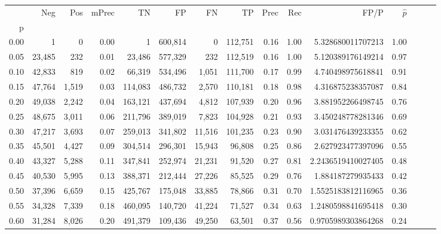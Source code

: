 \begin{tabular}{rrrrrrrrrrrrrrr}
\toprule
{} &     Neg &    Pos & mPrec &       TN &       FP &       FN &       TP &  Prec &   Rec &                  FP/P & $\hat{p}$ \\
p    &         &        &       &          &          &          &          &       &       &                       &           \\
\midrule
0.00 &       1 &      0 &  0.00 &        1 &  600,814 &        0 &  112,751 &  0.16 &  1.00 &     5.328680011707213 &      1.00 \\
0.05 &  23,485 &    232 &  0.01 &   23,486 &  577,329 &      232 &  112,519 &  0.16 &  1.00 &     5.120389176149214 &      0.97 \\
0.10 &  42,833 &    819 &  0.02 &   66,319 &  534,496 &    1,051 &  111,700 &  0.17 &  0.99 &     4.740498975618841 &      0.91 \\
0.15 &  47,764 &  1,519 &  0.03 &  114,083 &  486,732 &    2,570 &  110,181 &  0.18 &  0.98 &     4.316875238357087 &      0.84 \\
0.20 &  49,038 &  2,242 &  0.04 &  163,121 &  437,694 &    4,812 &  107,939 &  0.20 &  0.96 &     3.881952266498745 &      0.76 \\
0.25 &  48,675 &  3,011 &  0.06 &  211,796 &  389,019 &    7,823 &  104,928 &  0.21 &  0.93 &     3.450248778281346 &      0.69 \\
0.30 &  47,217 &  3,693 &  0.07 &  259,013 &  341,802 &   11,516 &  101,235 &  0.23 &  0.90 &     3.031476439233355 &      0.62 \\
0.35 &  45,501 &  4,427 &  0.09 &  304,514 &  296,301 &   15,943 &   96,808 &  0.25 &  0.86 &     2.627923477397096 &      0.55 \\
0.40 &  43,327 &  5,288 &  0.11 &  347,841 &  252,974 &   21,231 &   91,520 &  0.27 &  0.81 &    2.2436519410027405 &      0.48 \\
0.45 &  40,530 &  5,995 &  0.13 &  388,371 &  212,444 &   27,226 &   85,525 &  0.29 &  0.76 &     1.884187279935433 &      0.42 \\
0.50 &  37,396 &  6,659 &  0.15 &  425,767 &  175,048 &   33,885 &   78,866 &  0.31 &  0.70 &    1.5525183812116965 &      0.36 \\
0.55 &  34,328 &  7,339 &  0.18 &  460,095 &  140,720 &   41,224 &   71,527 &  0.34 &  0.63 &    1.2480598841695418 &      0.30 \\
0.60 &  31,284 &  8,026 &  0.20 &  491,379 &  109,436 &   49,250 &   63,501 &  0.37 &  0.56 &    0.9705989303864268 &      0.24 \\

\end{tabular}
